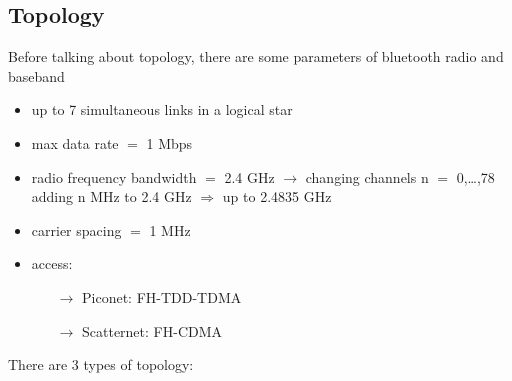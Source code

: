 \subsection{Topology}
Before talking about topology, there are some parameters of bluetooth radio and baseband
\begin{itemize}
    \item up to 7 simultaneous links in a logical star
    \item max data rate $=$ 1 Mbps
    \item radio frequency bandwidth $=$ 2.4 GHz $\rightarrow$ changing channels n $=$ 0,\dots,78\\
    adding n MHz to 2.4 GHz $\Rightarrow$ up to 2.4835 GHz
    \item carrier spacing $=$ 1 MHz
    \item access:
    \begin{itemize}
        \item[$\rightarrow$] Piconet: FH-TDD-TDMA
        \item[$\rightarrow$] Scatternet: FH-CDMA
    \end{itemize}
\end{itemize}
There are 3 types of topology:
